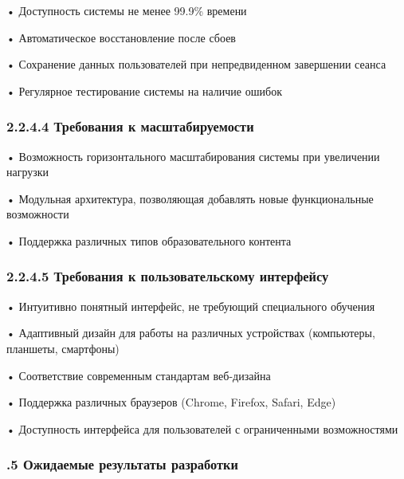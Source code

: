 {  \par \redline • Доступность системы не менее 99.9\% времени
  \par \redline • Автоматическое восстановление после сбоев
  \par \redline • Сохранение данных пользователей при непредвиденном завершении сеанса
  \par \redline • Регулярное тестирование системы на наличие ошибок

  \subsubsection*{2.2.4.4 Требования к масштабируемости}

  \par \redline • Возможность горизонтального масштабирования системы при увеличении нагрузки
  \par \redline • Модульная архитектура, позволяющая добавлять новые функциональные возможности
  \par \redline • Поддержка различных типов образовательного контента

  \subsubsection*{2.2.4.5 Требования к пользовательскому интерфейсу}

  \par \redline • Интуитивно понятный интерфейс, не требующий специального обучения
  \par \redline • Адаптивный дизайн для работы на различных устройствах (компьютеры, планшеты, смартфоны)
  \par \redline • Соответствие современным стандартам веб-дизайна
  \par \redline • Поддержка различных браузеров (Chrome, Firefox, Safari, Edge)
  \par \redline • Доступность интерфейса для пользователей с ограниченными возможностями

  \par
}

\subtitlespace

\subsubsection*{ 
  \gostTitleFont
  .5 Ожидаемые результаты разработки
} 

\subtitlespace

